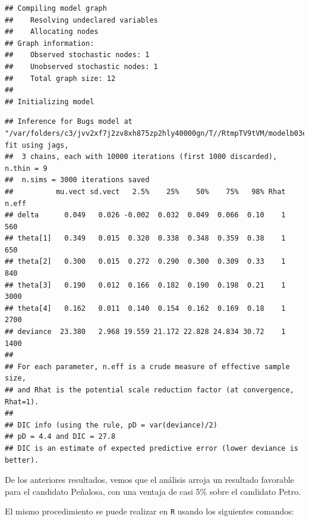 \begin{Eje}
\begin{knitrout}
\begin{kframe}
\begin{alltt}
 \hlkwb{<-} \hlstd{(} 
                      \hlstd{=}\hlstd{,} \hlstd{=}\hlstd{,} 
\end{alltt}
\begin{verbatim}
## Compiling model graph
##    Resolving undeclared variables
##    Allocating nodes
## Graph information:
##    Observed stochastic nodes: 1
##    Unobserved stochastic nodes: 1
##    Total graph size: 12
## 
## Initializing model
\end{verbatim}
\begin{alltt}
\end{alltt}
\begin{verbatim}
## Inference for Bugs model at "/var/folders/c3/jvv2xf7j2zv8xh875zp2hly40000gn/T//RtmpTV9tVM/modelb03e6cef453d.txt", fit using jags,
##  3 chains, each with 10000 iterations (first 1000 discarded), n.thin = 9
##  n.sims = 3000 iterations saved
##          mu.vect sd.vect   2.5%    25%    50%    75%   98% Rhat n.eff
## delta      0.049   0.026 -0.002  0.032  0.049  0.066  0.10    1   560
## theta[1]   0.349   0.015  0.320  0.338  0.348  0.359  0.38    1   650
## theta[2]   0.300   0.015  0.272  0.290  0.300  0.309  0.33    1   840
## theta[3]   0.190   0.012  0.166  0.182  0.190  0.198  0.21    1  3000
## theta[4]   0.162   0.011  0.140  0.154  0.162  0.169  0.18    1  2700
## deviance  23.380   2.968 19.559 21.172 22.828 24.834 30.72    1  1400
## 
## For each parameter, n.eff is a crude measure of effective sample size,
## and Rhat is the potential scale reduction factor (at convergence, Rhat=1).
## 
## DIC info (using the rule, pD = var(deviance)/2)
## pD = 4.4 and DIC = 27.8
## DIC is an estimate of expected predictive error (lower deviance is better).
\end{verbatim}
\end{kframe}
\end{knitrout}
De los anteriores resultados, vemos que el análisis arroja un resultado favorable para el candidato Peñalosa, con una ventaja de casi 5\% sobre el candidato Petro. 

El mismo procedimiento se puede realizar en \verb'R' usando los siguientes comandos:


\end{Eje}
